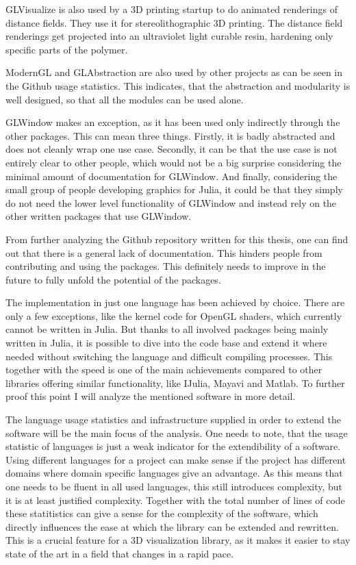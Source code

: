 GLVisualize is also used by a 3D printing startup\cite{AddSub} to do animated renderings of distance fields.
They use it for stereolithographic 3D printing. 
The distance field renderings get projected into an ultraviolet light curable resin, hardening only specific parts of the polymer.

ModernGL and GLAbstraction are also used by other projects as can be seen in the Github usage statistics.
This indicates, that the abstraction and modularity is well designed, so that all the modules can be used alone.

GLWindow makes an exception, as it has been used only indirectly through the other packages. 
This can mean three things.
Firstly, it is badly abstracted and does not cleanly wrap one use case.
Secondly, it can be that the use case is not entirely clear to other people, which would not be a big surprise considering the minimal amount of documentation for GLWindow.
And finally, considering the small group of people developing graphics for Julia, it could be that they simply do not need the lower level functionality of GLWindow and instead rely on the other written packages that use GLWindow.

From further analyzing the Github repository written for this thesis, one can find out that there is a general lack of documentation.
This hinders people from contributing and using the packages. This definitely needs to improve in the future to fully unfold the potential of the packages.

The implementation in just one language has been achieved by choice. 
There are only a few exceptions, like the kernel code for OpenGL shaders, which currently cannot be written in Julia.
But thanks to all involved packages being mainly written in Julia, it is possible to dive into the code base and extend it where needed without switching the language and difficult compiling processes.
This together with the speed is one of the main achievements compared to other libraries offering similar functionality, like IJulia, Mayavi and Matlab.
To further proof this point I will analyze the mentioned software in more detail.

The language usage statistics and infrastructure supplied in order to extend the software will be the main focus of the analysis.
One needs to note, that the usage statistic of languages is just a weak indicator for the extendibility of a software.
Using different languages for a project can make sense if the project has different domains where domain specific languages give an advantage. 
As this means that one needs to be fluent in all used languages, this still introduces complexity, but it is at least justified complexity.
Together with the total number of lines of code these statitistics can give a sense for the complexity of the software, which directly influences the ease at which the library can be extended and rewritten.
This is a crucial feature for a 3D visualization library, as it makes it easier to stay state of the art in a field that changes in a rapid pace.

